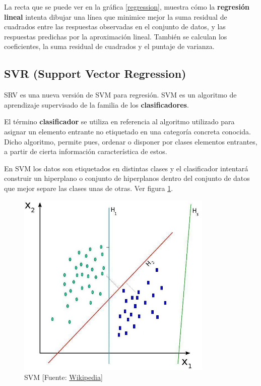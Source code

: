 	La recta que se puede ver en la gráfica \ref{regression}, muestra cómo la \textbf{regresión lineal} intenta dibujar una línea que minimice mejor la suma residual de cuadrados entre las respuestas observadas en el conjunto de datos, y las respuestas predichas por la aproximación lineal.
	También se calculan los coeficientes, la suma residual de cuadrados y el puntaje de varianza.

	\subsection{SVR (Support Vector Regression)}
	\label{makereference4.3.2}

	SRV es una nueva versión de SVM para regresión. SVM es un algoritmo de aprendizaje supervisado de la familia de los \textbf{clasificadores}.

	El término \textbf{clasificador} se utiliza en referencia al algoritmo utilizado para asignar un elemento entrante no etiquetado en una categoría concreta conocida. Dicho algoritmo, permite pues, ordenar o disponer por clases elementos entrantes, a partir de cierta información característica de estos.

	En SVM los datos son etiquetados en distintas clases y el clasificador intentará construir un hiperplano o conjunto de hiperplanos dentro del conjunto de datos que mejor separe las clases unas de otras. Ver figura \ref{svm}.

	\begin{figure}[htb]
		
		\begin{center}
			\includegraphics[height=3.5in]{figures/svm.jpg}
			\caption{SVM [Fuente: \href{www.wikipedia.org}{Wikipedia}]}
		\end{center}
		\label{svm}
	\end{figure}


